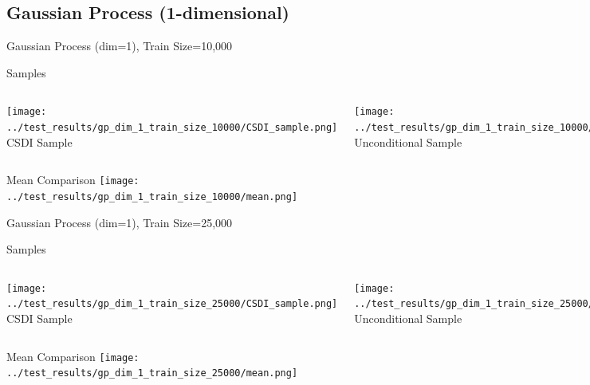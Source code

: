 \documentclass[8pt]{beamer}
\renewcommand{\|}{\ensuremath{\hspace{0.1cm} | \hspace{0.1cm}}}
\begin{document}
    \subsection{Gaussian Process (1-dimensional)}

    \begin{frame}{Gaussian Process (dim=1), Train Size=10,000}
    \begin{block}{Samples}
    \begin{columns}
        \centering
        \texttt{[image: ../test\_results/gp\_dim\_1\_train\_size\_10000/CSDI\_sample.png]}
        CSDI Sample
        
        \centering
        \texttt{[image: ../test\_results/gp\_dim\_1\_train\_size\_10000/UNCOND\_sample.png]}
        Unconditional Sample
    \end{columns}
    \end{block}

    \begin{block}{Mean Comparison}
    \centering
    \texttt{[image: ../test\_results/gp\_dim\_1\_train\_size\_10000/mean.png]}
    \end{block}
    \end{frame}

    \begin{frame}{Gaussian Process (dim=1), Train Size=25,000}
    \begin{block}{Samples}
    \begin{columns}
        \centering
        \texttt{[image: ../test\_results/gp\_dim\_1\_train\_size\_25000/CSDI\_sample.png]}
        CSDI Sample
        
        \centering
        \texttt{[image: ../test\_results/gp\_dim\_1\_train\_size\_25000/UNCOND\_sample.png]}
        Unconditional Sample
    \end{columns}
    \end{block}

    \begin{block}{Mean Comparison}
    \centering
    \texttt{[image: ../test\_results/gp\_dim\_1\_train\_size\_25000/mean.png]}
    \end{block}
    \end{frame}
\end{document}

